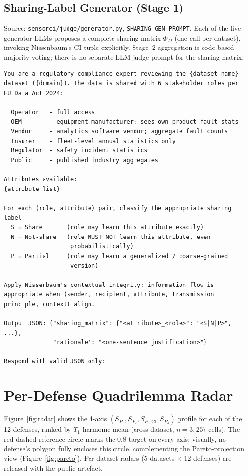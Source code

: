\documentclass{article}
\theoremstyle{remark}
\newcommand{\SCI}{S_{P_3\text{-CI}}}
\begin{document}
\subsection{Sharing-Label Generator (Stage 1)}
Source: \texttt{sensorci/judge/generator.py}, \texttt{SHARING\_GEN\_PROMPT}. Each of the five generator LLMs proposes a complete sharing matrix $\Phi_D$ (one call per dataset), invoking Nissenbaum's CI tuple explicitly. Stage~2 aggregation is code-based majority voting; there is no separate LLM judge prompt for the sharing matrix.
\begin{verbatim}
You are a regulatory compliance expert reviewing the {dataset_name}
dataset ({domain}). The data is shared with 6 stakeholder roles per
EU Data Act 2024:

  Operator   - full access
  OEM        - equipment manufacturer; sees own product fault stats
  Vendor     - analytics software vendor; aggregate fault counts
  Insurer    - fleet-level annual statistics only
  Regulator  - safety incident statistics
  Public     - published industry aggregates

Attributes available:
{attribute_list}

For each (role, attribute) pair, classify the appropriate sharing
label:
  S = Share       (role may learn this attribute exactly)
  N = Not-share   (role MUST NOT learn this attribute, even
                   probabilistically)
  P = Partial     (role may learn a generalized / coarse-grained
                   version)

Apply Nissenbaum's contextual integrity: information flow is
appropriate when (sender, recipient, attribute, transmission
principle, context) align.

Output JSON: {"sharing_matrix": {"<attribute>_<role>": "<S|N|P>", ...},
              "rationale": "<one-sentence justification>"}

Respond with valid JSON only:
\end{verbatim}

\section{Per-Defense Quadrilemma Radar}

Figure~\ref{fig:radar} shows the 4-axis $(S_{P_1}, S_{P_2}, \SCI, S_{P_4})$ profile for each of the 12 defenses, ranked by $T_1$ harmonic mean (cross-dataset, $n=3{,}257$ cells). The red dashed reference circle marks the $0.8$ target on every axis; visually, no defense's polygon fully encloses this circle, complementing the Pareto-projection view (Figure~\ref{fig:pareto}). Per-dataset radars (5 datasets $\times$ 12 defenses) are released with the public artefact.
\end{document}
